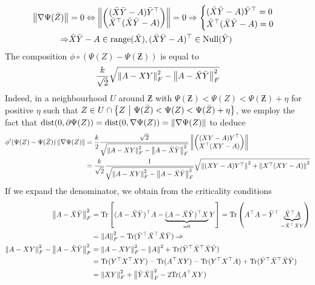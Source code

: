 \documentclass[10pt]{article}
\begin{document}
\begin{align*}
    \left \| \nabla \Psi(\bar{Z}) \right \| &= 0 \Leftrightarrow
    \left \| \begin{pmatrix} (\bar{X} \bar{Y} - A) \bar{Y}^\top \\ \bar{X}^\top (\bar{X} \bar{Y} - A) \end{pmatrix} \right \| =
    0 \Rightarrow
    \begin{cases}
        (\bar{X} \bar{Y} - A) \bar{Y}^\top = 0 \\
        \bar{X}^\top (\bar{X} \bar{Y} - A) = 0
    \end{cases} \\
    \Rightarrow &
        \bar{X} \bar{Y} - A \in \mathrm{range}(\bar{X}), (\bar{X} \bar{Y} - A)^\top \in
        \mathrm{Null}(\bar{Y})
\end{align*}
The composition $\phi \circ (\Psi(Z) - \Psi(\Zbar))$ is equal to
\[
    \frac{k}{\sqrt{2}} \sqrt{\left \| A - XY \right \|_F^2 - \left \| A - \bar{X} \bar{Y} \right \|_F^2}
\]
Indeed, in a neighbourhood $U$ around $\Zbar$ with $
\Psi(\Zbar) < \Psi(Z) < \Psi(\Zbar) + \eta$ for positive $\eta$ such that
$Z \in U \cap \left\{ Z \ \middle| \  \Psi(\bar{Z}) < \Psi(Z) < \Psi(\bar{Z}) + \eta \right\}$,
we employ the fact that $\mathrm{dist}(0, \partial \Psi(Z)) =
\mathrm{dist}(0, \nabla \Psi(Z)) = \left \| \nabla \Psi(Z) \right \|$ to deduce
\begin{align*}
    \phi'(\Psi(Z) - \Psi(\bar{Z})) \left \| \nabla \Psi(Z) \right \| &=
    \frac{k}{2} \frac{\sqrt{2}}{\sqrt{\left \| A - XY \right \|_F^2 - \left \| A - \bar{X}
    \bar{Y} \right \|_F^2}}
    \left \| \begin{pmatrix} (X Y - A)Y^\top \\ X^\top (XY - A) \end{pmatrix} \right \| \\
    &= \frac{k}{\sqrt{2}} \frac{1}{\sqrt{\left \| A - XY \right \|_F^2 - \left \| A - \bar{X}
    \bar{Y} \right \|_F^2}} \sqrt{\left \| (XY - A)Y^\top \right \|^2 + \left \| X^\top(XY - A) \right \|^2}
\end{align*}
If we expand the denominator, we obtain from the criticality conditions
\begin{align*}
    \left \| A - \bar{X} \bar{Y} \right \|_F^2 &=
    \mathrm{Tr}\left[ (A - \bar{X} \bar{Y})^\top A - \underbrace{(A -
    \bar{X}\bar{Y})^\top X}_{= 0} Y \right]
    = \mathrm{Tr}\left( A^\top A -\bar{Y}^\top \underbrace{\bar{X}^\top A}_{=
    \bar{X}^\top \bar{X} Y} \right) \\
    &= \left \| A \right \|_F^2 - \mathrm{Tr}(\bar{Y}^\top
    \bar{X}^\top \bar{X} \bar{Y}) \Rightarrow \\
    \left \| A - XY \right \|_F^2 - \left \| A - \bar{X} \bar{Y} \right \|_F^2 &=
    \left \| A - XY \right \|_F^2 - \left \| A \right \|^2 + \mathrm{Tr}(\bar{Y}^\top \bar{X}^\top
    \bar{X} \bar{Y}) \\
    &= \mathrm{Tr}(Y^\top X^\top X Y) - \mathrm{Tr}(A^\top XY) -
       \mathrm{Tr}(Y^\top X^\top A) + \mathrm{Tr}(\bar{Y}^\top \bar{X}^\top
       \bar{X} \bar{Y}) \\
    &= \left \| XY \right \|_F^2 + \left \| \bar{Y} \bar{X} \right \|_F^2 - 2 \mathrm{Tr}(A^\top XY)
\end{align*}
\end{document}
